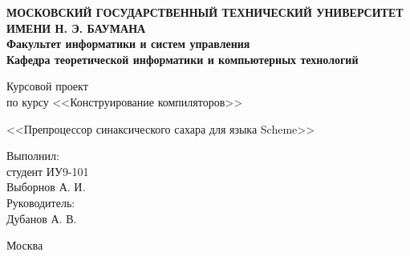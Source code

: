 \documentclass[12pt,a4paper,oneside]{extarticle}
\begin{document}
\pgfplotsset{compat=1.8}

\thispagestyle{empty}
\newpage
{
\centering


\textbf{
МОСКОВСКИЙ ГОСУДАРСТВЕННЫЙ ТЕХНИЧЕСКИЙ УНИВЕРСИТЕТ ИМЕНИ Н. Э. БАУМАНА \\
Факультет информатики и систем управления \\
Кафедра теоретической информатики и компьютерных технологий}
\bigskip
\bigskip
\bigskip
\bigskip
\bigskip
\bigskip
\bigskip

\vfill


Курсовой проект \\
по курсу <<Конструирование компиляторов>>

\bigskip

{\large <<Препроцессор синаксического сахара для языка Scheme>>}
\bigskip

\vfill



\hfill\parbox{4cm} {
Выполнил:\\
студент ИУ9-101 \hfill \\
Выборнов А. И.\hfill \medskip\\
Руководитель:\\
Дубанов А. В.\hfill
}


\vspace{\fill}

Москва \number\year
\clearpage
}


\tableofcontents

\clearpage
\end{document}

